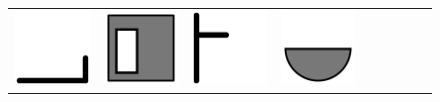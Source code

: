 \documentclass[doc]{apa6}
\newcommand{\stimulusscale}{.1}
\begin{document}
\begin{figure}[t]
\begin{center}
\begin{tabular}{c|cccccccc}
\includegraphics[scale=\stimulusscale]{./set16stim55.png} &
\includegraphics[scale=\stimulusscale]{./set17stim55.png} &
\includegraphics[scale=\stimulusscale]{./set18stim55.png} &
\includegraphics[scale=\stimulusscale]{./set19stim55.png} &

\end{tabular}
\end{center}
\end{figure}
\end{document}
